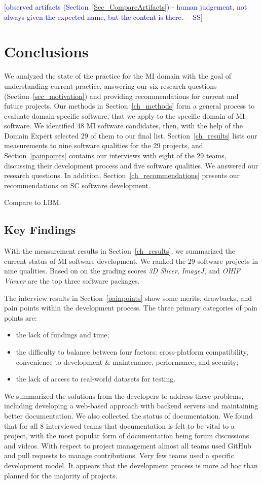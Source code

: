 \documentclass[final, 3p, times, authoryear]{elsarticle}
\newcommand{\authornote}[3]{\textcolor{#1}{[#3 ---#2]}}
\newcommand{\authornote}[3]{}
\newcommand{\wss}[1]{\authornote{blue}{SS}{#1}} %
\begin{document}
\wss{observed artifacts (Section~\ref{Sec_CompareArtifacts}) - human judgement,
not always given the expected name, but the content is there.}

\section{Conclusions} \label{ch_conclusions}

We analyzed the state of the practice for the MI domain with the goal of
understanding current practice, answering our six research questions
(Section~\ref{sec_motivation}) and providing recommendations for current and
future projects.  Our methods in Section~\ref{ch_methods} form a general process
to evaluate domain-specific software, that we apply to the specific domain of MI
software. We identified 48 MI software candidates, then, with the help of the
Domain Expert selected 29 of them to our final list. Section~\ref{ch_results}
lists our measurements to nine software qualities for the 29 projects, and
Section~\ref{painpoints} contains our interviews with eight of the 29 teams,
discussing their development process and five software qualities.  We answered
our research questions. In addition, Section~\ref{ch_recommendations} presents
our recommendations on SC software development.

Compare to LBM.

\subsection{Key Findings}

With the measurement results in Section~\ref{ch_results}, we summarized the
current status of MI software development. We ranked the 29 software projects in
nine qualities.  Based on on the grading scores \textit{3D Slicer},
\textit{ImageJ}, and \textit{OHIF Viewer} are the top three software packages.

The interview results in Section~\ref{painpoints} show some merits, drawbacks,
and pain points within the development process. The three primary categories of
pain points are:
\begin{itemize}
\item the lack of fundings and time;
\item the difficulty to balance between four factors: cross-platform
compatibility, convenience to development \& maintenance, performance, and
security;
\item the lack of access to real-world datasets for testing.
\end{itemize}
We summarized the solutions from the developers to address these problems,
including developing a web-based approach with backend servers and maintaining
better documentation. We also collected the status of documentation.  We found
that for all 8 interviewed teams that documentation is felt to be vital to a
project, with the most popular form of documentation being forum discussions and
videos.  With respect to project management almost all teams used GitHub and
pull requests to manage contributions.  Very few teams used a specific
development model.  It appears that the development process is more ad hoc than
planned for the majority of projects.
\end{document}
